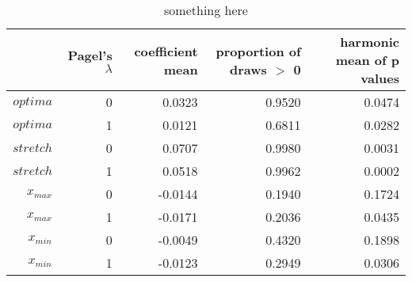 \begin{table}[ht]
\centering
\begin{tabular}{rrrrr}
  \hline
 & Pagel's $\lambda$ & coefficient mean & proportion of draws $>$ 0 & harmonic mean of p values \\ 
  \hline
$optima $ &     0 & 0.0323 & 0.9520 & 0.0474 \\ 
  $optima$ &     1 & 0.0121 & 0.6811 & 0.0282 \\ 
  $stretch $ &     0 & 0.0707 & 0.9980 & 0.0031 \\ 
  $stretch$ &     1 & 0.0518 & 0.9962 & 0.0002 \\ 
  $x_{max} $ &     0 & -0.0144 & 0.1940 & 0.1724 \\ 
  $x_{max}$ &     1 & -0.0171 & 0.2036 & 0.0435 \\ 
  $x_{min} $ &     0 & -0.0049 & 0.4320 & 0.1898 \\ 
  $x_{min}$ &     1 & -0.0123 & 0.2949 & 0.0306 \\ 
   \hline
\end{tabular}
\caption{something here} 
\end{table}

